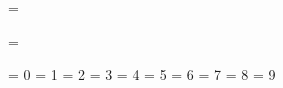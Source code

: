 %
%
%
%
%




\setflag \zxdivopen = \false

\setflag \zxcompavail = \false

\chardef \xrefbadmode       = 0         %
\chardef \xrefrunmode       = 1         %
\chardef \xrefsnapmode      = 2         %
\chardef \xrefcopymode      = 3         %
\chardef \xrefloadmodes     = 4         %
\chardef \xrefloadtagmode   = 5         %
\chardef \xrefloadtocmode   = 6         %
\chardef \xrefloadauxmode   = 7         %
\chardef \xrefloadendmode   = 8         %
\chardef \xrefloadcitemode  = 9         %

\let \xrefmode = \xrefbadmode           %



